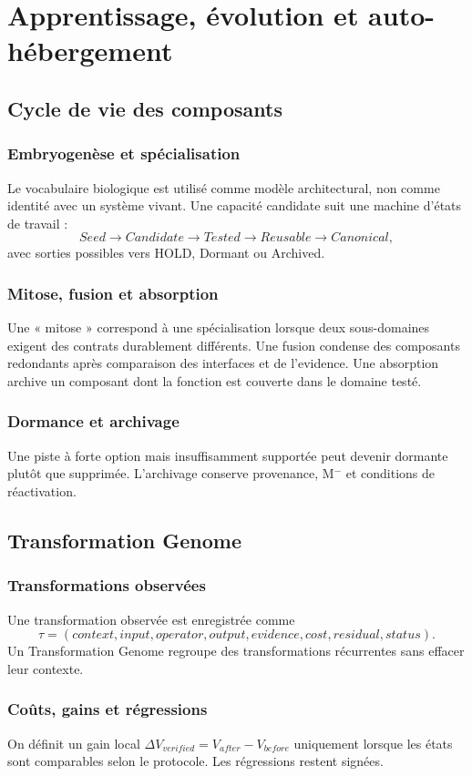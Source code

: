 \part{Apprentissage, évolution et auto-hébergement}

\chapter{Cycle de vie des composants}
\section{Embryogenèse et spécialisation}
Le vocabulaire biologique est utilisé comme modèle architectural, non comme identité avec un système vivant. Une capacité candidate suit une machine d'états de travail :
\[
Seed\to Candidate\to Tested\to Reusable\to Canonical,
\]
avec sorties possibles vers HOLD, Dormant ou Archived.

\section{Mitose, fusion et absorption}
Une « mitose » correspond à une spécialisation lorsque deux sous-domaines exigent des contrats durablement différents. Une fusion condense des composants redondants après comparaison des interfaces et de l'evidence. Une absorption archive un composant dont la fonction est couverte dans le domaine testé.

\section{Dormance et archivage}
Une piste à forte option mais insuffisamment supportée peut devenir dormante plutôt que supprimée. L'archivage conserve provenance, M$^-$ et conditions de réactivation.

\chapter{Transformation Genome}
\section{Transformations observées}
Une transformation observée est enregistrée comme
\[
\tau=(context,input,operator,output,evidence,cost,residual,status).
\]
Un Transformation Genome regroupe des transformations récurrentes sans effacer leur contexte.

\section{Coûts, gains et régressions}
On définit un gain local $\Delta V_{verified}=V_{after}-V_{before}$ uniquement lorsque les états sont comparables selon le protocole. Les régressions restent signées.

